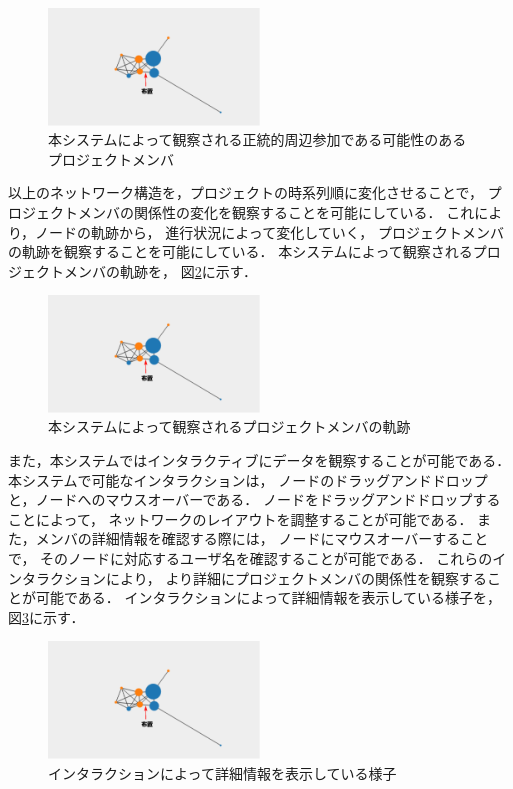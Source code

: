 \documentclass[submit,techrep]{ipsj}
\begin{document}
\begin{figure}[h]
  \centering
  \includegraphics[width=0.5\textwidth]{img/cop-map-lpp.eps}
  \caption{本システムによって観察される正統的周辺参加である可能性のあるプロジェクトメンバ}
  \label{cop-map-lpp}
\end{figure}

以上のネットワーク構造を，プロジェクトの時系列順に変化させることで，
プロジェクトメンバの関係性の変化を観察することを可能にしている．
これにより，ノードの軌跡から，
進行状況によって変化していく，
プロジェクトメンバの軌跡を観察することを可能にしている．
本システムによって観察されるプロジェクトメンバの軌跡を，
図\ref{cop-map-trajectory}に示す．

\begin{figure}[h]
  \centering
  \includegraphics[width=0.5\textwidth]{img/cop-map-trajectory.eps}
  \caption{本システムによって観察されるプロジェクトメンバの軌跡}
  \label{cop-map-trajectory}
\end{figure}

また，本システムではインタラクティブにデータを観察することが可能である．
本システムで可能なインタラクションは，
ノードのドラッグアンドドロップと，ノードへのマウスオーバーである．
ノードをドラッグアンドドロップすることによって，
ネットワークのレイアウトを調整することが可能である．
また，メンバの詳細情報を確認する際には，
ノードにマウスオーバーすることで，
そのノードに対応するユーザ名を確認することが可能である．
これらのインタラクションにより，
より詳細にプロジェクトメンバの関係性を観察することが可能である．
インタラクションによって詳細情報を表示している様子を，
図\ref{cop-map-detail}に示す．

\begin{figure}[h]
  \centering
  \includegraphics[width=0.5\textwidth]{img/cop-map-detail.eps}
  \caption{インタラクションによって詳細情報を表示している様子}
  \label{cop-map-detail}
\end{figure}
\end{document}
